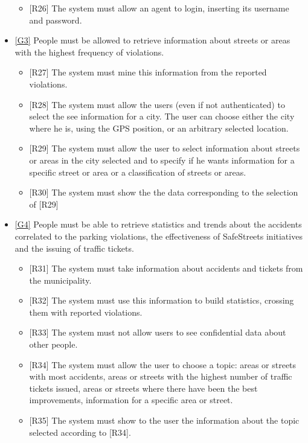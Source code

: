 \documentclass[a4paper]{report}
\begin{document}
\begin{itemize}
\begin{itemize}
\item {[R26]}	\label{R26}The system must allow an agent to login, inserting its username and password.
\end{itemize}
\item  \hyperref[G3]{[G3]} People must be allowed to retrieve information about streets or areas with the highest frequency of violations.
\begin{itemize}
\item {[R27]}	\label{R27}The system must mine this information from the reported violations.
\item {[R28]}	\label{R28}The system must allow the users (even if not authenticated) to select the see information for a city. The user can choose either the city where he is, using the GPS position, or an arbitrary selected location.
\item {[R29]}	\label{R29}The system must allow the user to select information about streets or areas in the city selected and to specify if he wants information for a specific street or area or a classification of streets or areas.
\item {[R30]}	\label{R30}The system must show the the data corresponding to the selection of [R29]
\end{itemize}
\item  \hyperref[G4]{[G4]} People must be able to retrieve statistics and trends about the accidents correlated to the parking violations, the effectiveness of SafeStreets initiatives and the issuing of traffic tickets.
\begin{itemize}
\item {[R31]}	\label{R31}The system must take information about accidents and tickets from the municipality.
\item {[R32]}	\label{R32}The system must use this information to build statistics, crossing them with reported violations.
\item {[R33]}	\label{R33}The system must not allow users to see confidential data about other people.
\item {[R34]}	\label{R34}The system must allow the user to choose a topic: areas or streets with most accidents, areas or streets with the highest number of traffic tickets issued, areas or streets where there have been the best improvements, information for a specific area or street.
\item {[R35]}	\label{R35}The system must show to the user the information about the topic selected according to [R34].
\end{itemize}

\end{itemize}
\end{document}
